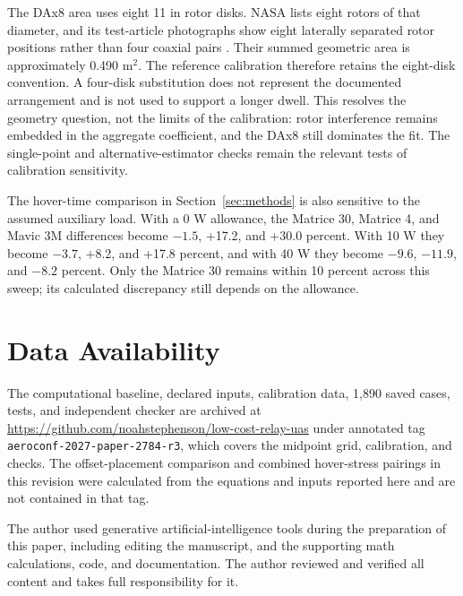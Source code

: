 \documentclass[twocolumn,letterpaper]{IEEEAerospaceCLS}
\begin{document}
The DAx8 area uses eight 11 in rotor disks. NASA lists eight rotors of that diameter, and its test-article photographs show eight laterally separated rotor positions rather than four coaxial pairs \cite[Table 1 and Figs. 5 and 12]{russell2016}. Their summed geometric area is approximately 0.490 m$^2$. The reference calibration therefore retains the eight-disk convention. A four-disk substitution does not represent the documented arrangement and is not used to support a longer dwell. This resolves the geometry question, not the limits of the calibration: rotor interference remains embedded in the aggregate coefficient, and the DAx8 still dominates the fit. The single-point and alternative-estimator checks remain the relevant tests of calibration sensitivity.

The hover-time comparison in Section~\ref{sec:methods} is also sensitive to the assumed auxiliary load. With a 0 W allowance, the Matrice 30, Matrice 4, and Mavic 3M differences become $-1.5$, +17.2, and +30.0 percent. With 10 W they become $-3.7$, +8.2, and +17.8 percent, and with 40 W they become $-9.6$, $-11.9$, and $-8.2$ percent. Only the Matrice 30 remains within 10 percent across this sweep; its calculated discrepancy still depends on the allowance.


\section*{Data Availability}
The computational baseline, declared inputs, calibration data, 1,890 saved cases, tests, and independent checker are archived at \url{https://github.com/noahstephenson/low-cost-relay-uas} under annotated tag \nolinkurl{aeroconf-2027-paper-2784-r3}, which covers the midpoint grid, calibration, and checks. The offset-placement comparison and combined hover-stress pairings in this revision were calculated from the equations and inputs reported here and are not contained in that tag.
\acknowledgements

The author used generative artificial-intelligence tools during the preparation of this paper, including editing the manuscript, and the supporting math calculations, code, and documentation. The author reviewed and verified all content and takes full responsibility for it.
\end{document}
